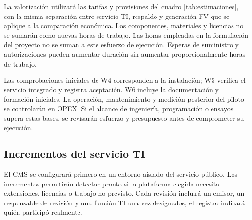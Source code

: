 
La valorización utilizará las tarifas y provisiones del cuadro \ref{tab:estimaciones}, con la misma separación entre servicio TI, respaldo y generación FV que se aplique a la comparación económica. Los componentes, materiales y licencias no se sumarán como nuevas horas de trabajo. Las horas empleadas en la formulación del proyecto no se suman a este esfuerzo de ejecución. Esperas de suministro y autorizaciones pueden aumentar duración sin aumentar proporcionalmente horas de trabajo.

Las comprobaciones iniciales de W4 corresponden a la instalación; W5 verifica el servicio integrado y registra aceptación. W6 incluye la documentación y formación iniciales. La operación, mantenimiento y medición posterior del piloto se controlarán en OPEX. Si el alcance de ingeniería, programación o ensayos supera estas bases, se revisarán esfuerzo y presupuesto antes de comprometer su ejecución.

\subsection{Incrementos del servicio TI}
El CMS se configurará primero en un entorno aislado del servicio público. Los incrementos permitirán detectar pronto si la plataforma elegida necesita extensiones, licencias o trabajo no previsto. Cada revisión incluirá un emisor, un responsable de revisión y una función TI una vez designados; el registro indicará quién participó realmente.


